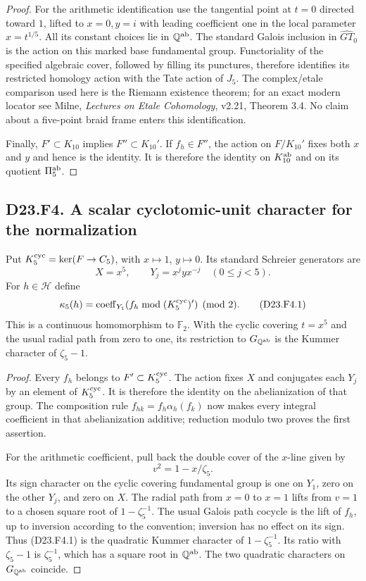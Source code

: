 \begin{proof}
For the arithmetic identification use the tangential point
at $t=0$ directed toward $1$, lifted to $x=0,y=i$ with leading
coefficient one in the local parameter $x=t^{1/5}$.
All its constant choices lie in $\mathbb Q^{\rm ab}$.
The standard Galois inclusion in $\widehat{GT}_0$ is the action
on this marked base fundamental group.  Functoriality of the
specified algebraic cover, followed by filling its punctures,
therefore identifies its restricted homology action with the
Tate action of $J_5$.  The complex/etale comparison used here is
the Riemann existence theorem; for an exact modern locator see
Milne, \emph{Lectures on Etale Cohomology}, v2.21, Theorem 3.4.
No claim about a five-point braid frame enters this identification.

Finally, $F'\subset K_{10}$ implies $F''\subset K_{10}'$.
If $f_h\in F''$, the action on $F/K_{10}'$ fixes both $x$ and
$y$ and hence is the identity.  It is therefore the identity on
$K_{10}^{\rm ab}$ and on its quotient $\Pi_5^{\rm ab}$.
\end{proof}

\subsection*{D23.F4. A scalar cyclotomic-unit character for the normalization}
Put $K_5^{\rm cyc}=\ker(F\to C_5)$, with $x\mapsto1$,
$y\mapsto0$.  Its standard Schreier generators are
\[
 X=x^5,\qquad Y_j=x^j y x^{-j}\quad(0\leq j<5).
\]
For $h\in\mathcal H$ define
\[
 \kappa_5(h)=\operatorname{coeff}_{Y_1}
       (f_h\bmod (K_5^{\rm cyc})')\pmod2.
 \tag{D23.F4.1}
\]
This is a continuous homomorphism to $\mathbb F_2$.
With the cyclic covering $t=x^5$ and the usual radial path
from zero to one, its restriction to $G_{\mathbb Q^{\rm ab}}$
is the Kummer character of $\zeta_5-1$.

\begin{proof}
Every $f_h$ belongs to $F'\subset K_5^{\rm cyc}$.  The action
fixes $X$ and conjugates each $Y_j$ by an element of
$K_5^{\rm cyc}$.  It is therefore the identity on the
abelianization of that group.  The composition rule
$f_{hk}=f_h\alpha_h(f_k)$ now makes every integral coefficient
in that abelianization additive; reduction modulo two proves
the first assertion.

For the arithmetic coefficient, pull back the double cover of
the $x$-line given by
\[
 v^2=1-x/\zeta_5.
\]
Its sign character on the cyclic covering fundamental group
is one on $Y_1$, zero on the other $Y_j$, and zero on $X$.
The radial path from $x=0$ to $x=1$ lifts from $v=1$ to a
chosen square root of $1-\zeta_5^{-1}$.  The usual Galois
path cocycle is the lift of $f_h$, up to inversion according
to the convention; inversion has no effect on its sign.
Thus (D23.F4.1) is the quadratic Kummer character of
$1-\zeta_5^{-1}$.  Its ratio with $\zeta_5-1$ is $\zeta_5^{-1}$,
which has a square root in $\mathbb Q^{\rm ab}$.  The two
quadratic characters on $G_{\mathbb Q^{\rm ab}}$ coincide.
\end{proof}

